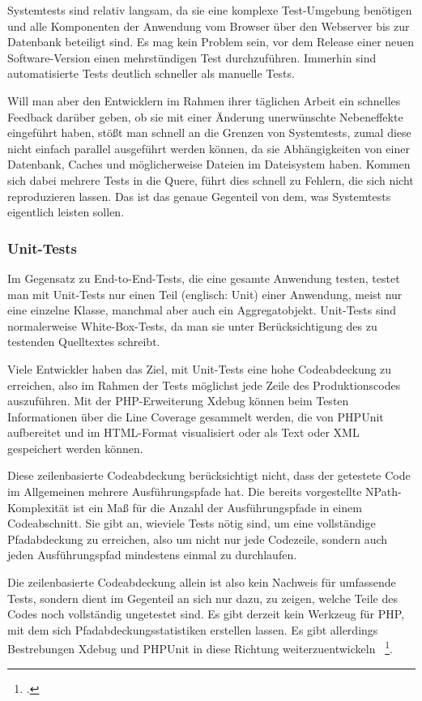 Systemtests sind relativ langsam, da sie eine komplexe Test-Umgebung benötigen und alle Komponenten der Anwendung vom Browser über den Webserver bis zur Datenbank beteiligt sind. Es mag kein Problem sein, vor dem Release einer neuen Software-Version einen mehrstündigen Test durchzuführen. Immerhin sind automatisierte Tests deutlich schneller als manuelle Tests.

Will man aber den Entwicklern im Rahmen ihrer täglichen Arbeit ein schnelles Feedback darüber geben, ob sie mit einer Änderung unerwünschte Nebeneffekte eingeführt haben, stößt man schnell an die Grenzen von Systemtests, zumal diese nicht einfach parallel ausgeführt werden können, da sie Abhängigkeiten von einer Datenbank, Caches und möglicherweise Dateien im Dateisystem haben. Kommen sich dabei mehrere Tests in die Quere, führt dies schnell zu Fehlern, die sich nicht reproduzieren lassen. Das ist das genaue Gegenteil von dem, was Systemtests eigentlich leisten sollen.

\subsubsection{Unit-Tests}
Im Gegensatz zu End-to-End-Tests, die eine gesamte Anwendung testen, testet man mit Unit-Tests nur einen Teil (englisch: Unit) einer Anwendung, meist nur eine einzelne Klasse, manchmal aber auch ein Aggregatobjekt. Unit-Tests sind normalerweise White-Box-Tests, da man sie unter Berücksichtigung des zu testenden Quelltextes schreibt.

Viele Entwickler haben das Ziel, mit Unit-Tests eine hohe Codeabdeckung zu erreichen, also im Rahmen der Tests möglichst jede Zeile des Produktionscodes auszuführen. Mit der PHP-Erweiterung Xdebug können beim Testen Informationen über die Line Coverage gesammelt werden, die von PHPUnit aufbereitet und im HTML-Format visualisiert oder als Text oder XML gespeichert werden können.

Diese zeilenbasierte Codeabdeckung berücksichtigt nicht, dass der getestete Code im Allgemeinen mehrere Ausführungspfade hat. Die bereits vorgestellte NPath-Komplexität ist ein Maß für die Anzahl der Ausführungspfade in einem Codeabschnitt. Sie gibt an, wieviele Tests nötig sind, um eine vollständige Pfadabdeckung zu erreichen, also um nicht nur jede Codezeile, sondern auch jeden Ausführungspfad mindestens einmal zu durchlaufen.

Die zeilenbasierte Codeabdeckung allein ist also kein Nachweis für umfassende Tests, sondern dient im Gegenteil an sich nur dazu, zu zeigen, welche Teile des Codes noch vollständig ungetestet sind. Es gibt derzeit kein Werkzeug für PHP, mit dem sich Pfadabdeckungsstatistiken erstellen lassen. Es gibt allerdings Bestrebungen Xdebug und PHPUnit in diese Richtung weiterzuentwickeln ~\footcite[Vgl.]{Vergmann.2011}.

